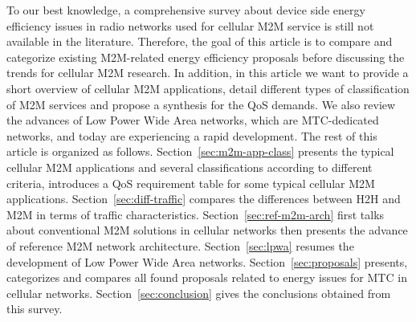 To our best knowledge, a comprehensive survey about device side energy efficiency issues in radio networks used for cellular M2M service is still not available in the literature. Therefore, the goal of this article is to compare and categorize existing M2M-related energy efficiency proposals before discussing the trends for cellular M2M research. In addition, in this article we want to provide a short overview of cellular M2M applications, detail different types of classification of M2M services and propose a synthesis for the QoS demands. We also review the advances of Low Power Wide Area networks, which are MTC-dedicated networks, and today are experiencing a rapid development. The rest of this article is organized as follows. Section~\ref{sec:m2m-app-class} presents the typical cellular M2M applications and several classifications according to different criteria, introduces a QoS requirement table for some typical cellular M2M applications. Section~\ref{sec:diff-traffic} compares the differences between H2H and M2M in terms of traffic characteristics. Section~\ref{sec:ref-m2m-arch} first talks about conventional M2M solutions in cellular networks then presents the advance of reference M2M network architecture. Section~\ref{sec:lpwa} resumes the development of Low Power Wide Area networks. Section~\ref{sec:proposals} presents, categorizes and compares all found proposals related to energy issues for MTC in cellular networks. Section~\ref{sec:conclusion} gives the conclusions obtained from this survey.